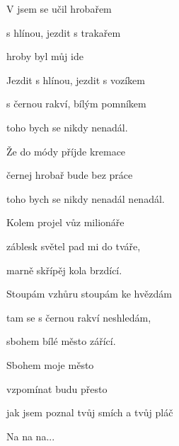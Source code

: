 

\zs
V  jsem se učil hrobařem

 s hlínou, jezdit s trakařem

 hroby byl můj ide
\ks

\zs
Jezdit s hlínou, jezdit s vozíkem

s černou rakví, bílým pomníkem

toho bych se nikdy nenadál.
\ks

\zs
Že do módy příjde kremace

černej hrobař bude bez práce

toho bych se nikdy nenadál nenadál.
\ks

\zs
Kolem projel vůz milionáře

záblesk světel pad mi do tváře,

marně skřípěj kola brzdící.
\ks

\zs
Stoupám vzhůru stoupám ke hvězdám

tam se s černou rakví neshledám,

sbohem bílé město zářící.
\ks

\zr
Sbohem moje město

vzpomínat budu přesto

jak jsem poznal tvůj smích a tvůj pláč
\kr

\zs
Na na na...
\ks

\kp






















